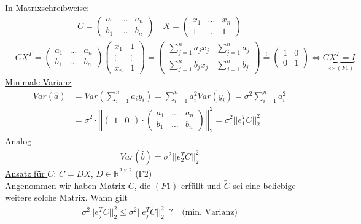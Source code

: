 \documentclass[a4paper,openany]{book}
\theoremstyle{mytheoremstyle}
\theoremstyle{mytheoremstyle2}
\begin{document}
\underline{In Matrixschreibweise}:
\begin{align*}
  C=\begin{pmatrix}
    a_1&...&a_n\\b_1&...&b_n
  \end{pmatrix}\quad X=\begin{pmatrix}
    x_1&...&x_n\\1&...&1
  \end{pmatrix}
\end{align*}
\begin{align*}
  &CX^T=\begin{pmatrix}
    a_1&...&a_n\\b_1&...&b_n
  \end{pmatrix}\begin{pmatrix}
    x_1&1\\\vdots&\vdots\\x_n&1
  \end{pmatrix}=\begin{pmatrix}
    \sum_{j=1}^{n}{a_jx_j}&\sum_{j=1}^{n}{a_j}\\\sum_{j=1}^{n}{b_jx_j}&\sum_{j=1}^{n}{b_j}
  \end{pmatrix}\overset{!}=\begin{pmatrix}1&0\\0&1\end{pmatrix} \Leftrightarrow \underbrace{CX^T=I}_{:\Leftrightarrow (F1)}
\end{align*}
\underline{Minimale Varianz}
\begin{align*}
  Var (\hat{a})
  &=Var \left(\sum_{i=1}^{n}{a_iy_i}\right)=\sum_{i=1}^{n}{a_i^2 Var(y _i)}=\sigma ^2 \sum_{i=1}^{n}{a_i^2}\\
  &=\sigma ^2 \cdot \left|\left|\begin{pmatrix}1&0\end{pmatrix}\cdot \begin{pmatrix}
  a_1&...&a_n\\b_1&...&b_n
  \end{pmatrix}\right|\right|_{2}^2=\sigma ^2||e_1^TC||_2^2
\end{align*}
Analog
\begin{align*}
  Var (\hat{b})=\sigma ^2||e_2^TC||_2^2
\end{align*}
\underline{Ansatz für $C$}: $C=DX$, $D \in \mathbb{R}^{2 \times 2}$ (F2) \\
Angenommen wir haben Matrix $C$, die $(F1)$ erfüllt und $\tilde{C}$ sei eine beliebige weitere solche Matrix. Wann gilt 
\begin{align*}
  \sigma ^2||e_j^TC||_2^2 \leq \sigma ^2||e_j^T \tilde{C}||_2^2 \;\;?\quad \text{(min. Varianz)}
\end{align*}
\end{document}
